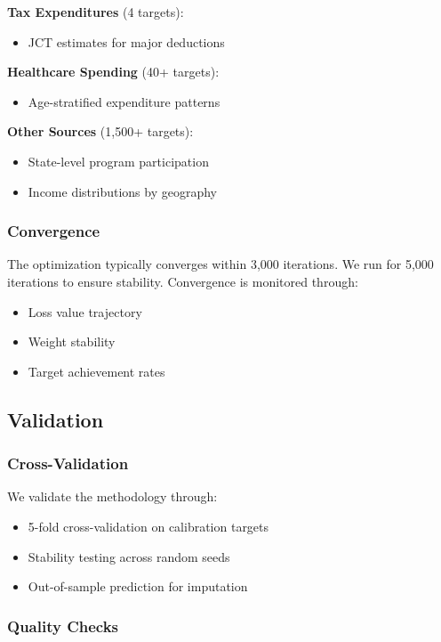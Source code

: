 {\textbf{Tax Expenditures} (4 targets):
\begin{itemize}
\item JCT estimates for major deductions
\end{itemize}

\textbf{Healthcare Spending} (40+ targets):
\begin{itemize}
\item Age-stratified expenditure patterns
\end{itemize}

\textbf{Other Sources} (1,500+ targets):
\begin{itemize}
\item State-level program participation
\item Income distributions by geography
\end{itemize}

\subsubsection{Convergence}

The optimization typically converges within 3,000 iterations. We run for 5,000 iterations to ensure stability. Convergence is monitored through:
\begin{itemize}
\item Loss value trajectory
\item Weight stability
\item Target achievement rates
\end{itemize}

\subsection{Validation}

\subsubsection{Cross-Validation}

We validate the methodology through:
\begin{itemize}
\item 5-fold cross-validation on calibration targets
\item Stability testing across random seeds
\item Out-of-sample prediction for imputation
\end{itemize}

\subsubsection{Quality Checks}

}

